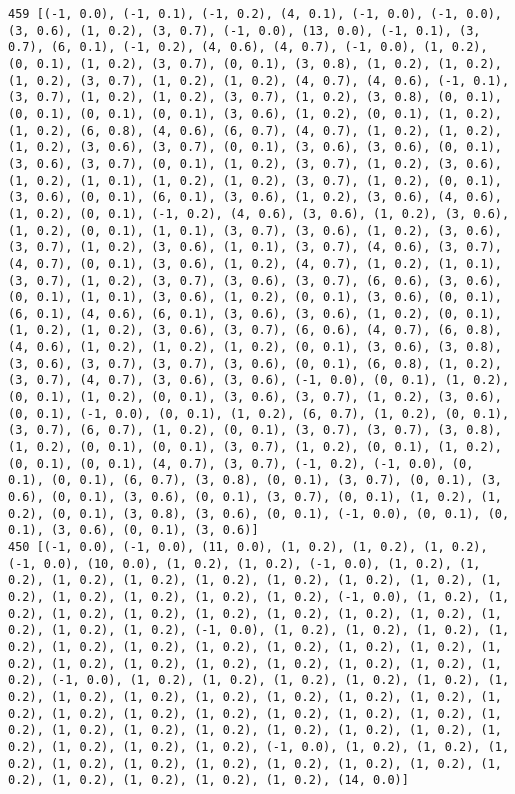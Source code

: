 \documentclass[11pt]{article}
\begin{document}
\begin{Verbatim}[commandchars=\\\{\}]
459 [(-1, 0.0), (-1, 0.1), (-1, 0.2), (4, 0.1), (-1, 0.0), (-1, 0.0), (3, 0.6), (1, 0.2), (3, 0.7), (-1, 0.0), (13, 0.0), (-1, 0.1), (3, 0.7), (6, 0.1), (-1, 0.2), (4, 0.6), (4, 0.7), (-1, 0.0), (1, 0.2), (0, 0.1), (1, 0.2), (3, 0.7), (0, 0.1), (3, 0.8), (1, 0.2), (1, 0.2), (1, 0.2), (3, 0.7), (1, 0.2), (1, 0.2), (4, 0.7), (4, 0.6), (-1, 0.1), (3, 0.7), (1, 0.2), (1, 0.2), (3, 0.7), (1, 0.2), (3, 0.8), (0, 0.1), (0, 0.1), (0, 0.1), (0, 0.1), (3, 0.6), (1, 0.2), (0, 0.1), (1, 0.2), (1, 0.2), (6, 0.8), (4, 0.6), (6, 0.7), (4, 0.7), (1, 0.2), (1, 0.2), (1, 0.2), (3, 0.6), (3, 0.7), (0, 0.1), (3, 0.6), (3, 0.6), (0, 0.1), (3, 0.6), (3, 0.7), (0, 0.1), (1, 0.2), (3, 0.7), (1, 0.2), (3, 0.6), (1, 0.2), (1, 0.1), (1, 0.2), (1, 0.2), (3, 0.7), (1, 0.2), (0, 0.1), (3, 0.6), (0, 0.1), (6, 0.1), (3, 0.6), (1, 0.2), (3, 0.6), (4, 0.6), (1, 0.2), (0, 0.1), (-1, 0.2), (4, 0.6), (3, 0.6), (1, 0.2), (3, 0.6), (1, 0.2), (0, 0.1), (1, 0.1), (3, 0.7), (3, 0.6), (1, 0.2), (3, 0.6), (3, 0.7), (1, 0.2), (3, 0.6), (1, 0.1), (3, 0.7), (4, 0.6), (3, 0.7), (4, 0.7), (0, 0.1), (3, 0.6), (1, 0.2), (4, 0.7), (1, 0.2), (1, 0.1), (3, 0.7), (1, 0.2), (3, 0.7), (3, 0.6), (3, 0.7), (6, 0.6), (3, 0.6), (0, 0.1), (1, 0.1), (3, 0.6), (1, 0.2), (0, 0.1), (3, 0.6), (0, 0.1), (6, 0.1), (4, 0.6), (6, 0.1), (3, 0.6), (3, 0.6), (1, 0.2), (0, 0.1), (1, 0.2), (1, 0.2), (3, 0.6), (3, 0.7), (6, 0.6), (4, 0.7), (6, 0.8), (4, 0.6), (1, 0.2), (1, 0.2), (1, 0.2), (0, 0.1), (3, 0.6), (3, 0.8), (3, 0.6), (3, 0.7), (3, 0.7), (3, 0.6), (0, 0.1), (6, 0.8), (1, 0.2), (3, 0.7), (4, 0.7), (3, 0.6), (3, 0.6), (-1, 0.0), (0, 0.1), (1, 0.2), (0, 0.1), (1, 0.2), (0, 0.1), (3, 0.6), (3, 0.7), (1, 0.2), (3, 0.6), (0, 0.1), (-1, 0.0), (0, 0.1), (1, 0.2), (6, 0.7), (1, 0.2), (0, 0.1), (3, 0.7), (6, 0.7), (1, 0.2), (0, 0.1), (3, 0.7), (3, 0.7), (3, 0.8), (1, 0.2), (0, 0.1), (0, 0.1), (3, 0.7), (1, 0.2), (0, 0.1), (1, 0.2), (0, 0.1), (0, 0.1), (4, 0.7), (3, 0.7), (-1, 0.2), (-1, 0.0), (0, 0.1), (0, 0.1), (6, 0.7), (3, 0.8), (0, 0.1), (3, 0.7), (0, 0.1), (3, 0.6), (0, 0.1), (3, 0.6), (0, 0.1), (3, 0.7), (0, 0.1), (1, 0.2), (1, 0.2), (0, 0.1), (3, 0.8), (3, 0.6), (0, 0.1), (-1, 0.0), (0, 0.1), (0, 0.1), (3, 0.6), (0, 0.1), (3, 0.6)]
450 [(-1, 0.0), (-1, 0.0), (11, 0.0), (1, 0.2), (1, 0.2), (1, 0.2), (-1, 0.0), (10, 0.0), (1, 0.2), (1, 0.2), (-1, 0.0), (1, 0.2), (1, 0.2), (1, 0.2), (1, 0.2), (1, 0.2), (1, 0.2), (1, 0.2), (1, 0.2), (1, 0.2), (1, 0.2), (1, 0.2), (1, 0.2), (1, 0.2), (-1, 0.0), (1, 0.2), (1, 0.2), (1, 0.2), (1, 0.2), (1, 0.2), (1, 0.2), (1, 0.2), (1, 0.2), (1, 0.2), (1, 0.2), (1, 0.2), (-1, 0.0), (1, 0.2), (1, 0.2), (1, 0.2), (1, 0.2), (1, 0.2), (1, 0.2), (1, 0.2), (1, 0.2), (1, 0.2), (1, 0.2), (1, 0.2), (1, 0.2), (1, 0.2), (1, 0.2), (1, 0.2), (1, 0.2), (1, 0.2), (1, 0.2), (-1, 0.0), (1, 0.2), (1, 0.2), (1, 0.2), (1, 0.2), (1, 0.2), (1, 0.2), (1, 0.2), (1, 0.2), (1, 0.2), (1, 0.2), (1, 0.2), (1, 0.2), (1, 0.2), (1, 0.2), (1, 0.2), (1, 0.2), (1, 0.2), (1, 0.2), (1, 0.2), (1, 0.2), (1, 0.2), (1, 0.2), (1, 0.2), (1, 0.2), (1, 0.2), (1, 0.2), (1, 0.2), (1, 0.2), (1, 0.2), (1, 0.2), (-1, 0.0), (1, 0.2), (1, 0.2), (1, 0.2), (1, 0.2), (1, 0.2), (1, 0.2), (1, 0.2), (1, 0.2), (1, 0.2), (1, 0.2), (1, 0.2), (1, 0.2), (1, 0.2), (1, 0.2), (14, 0.0)]

\end{Verbatim}
\end{document}
